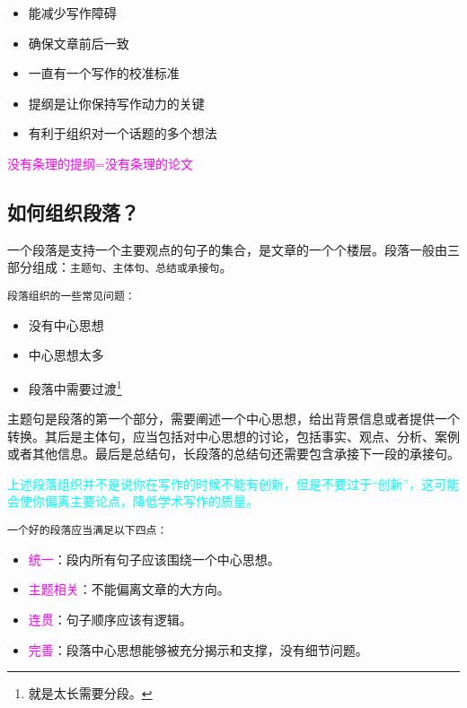 \documentclass[cn,hazy,blue,14pt,screen]{elegantnote} %
\begin{document}
\begin{itemize}
  \item 能减少写作障碍
  \item 确保文章前后一致
  \item 一直有一个写作的校准标准
  \item 提纲是让你保持写作动力的关键
  \item 有利于组织对一个话题的多个想法
\end{itemize}

\textcolor{magenta}{没有条理的提纲=没有条理的论文}

\subsection{如何组织段落？}

一个段落是支持一个主要观点的句子的集合，是文章的一个个楼层。段落一般由三部分组成：\lstinline{主题句、主体句、总结或承接句}。

\lstinline{段落组织的一些常见问题：}

\begin{itemize}
  \item 没有中心思想
  \item 中心思想太多
  \item 段落中需要过渡\footnote{就是太长需要分段。}
\end{itemize}

主题句是段落的第一个部分，需要阐述一个中心思想，给出背景信息或者提供一个转换。其后是主体句，应当包括对中心思想的讨论，包括事实、观点、分析、案例或者其他信息。最后是总结句，长段落的总结句还需要包含承接下一段的承接句。

\textcolor{cyan}{上述段落组织并不是说你在写作的时候不能有创新，但是不要过于“创新”，这可能会使你偏离主要论点，降低学术写作的质量。}

\lstinline{一个好的段落应当满足以下四点：}

\begin{itemize}
  \item \textcolor{magenta}{统一}：段内所有句子应该围绕一个中心思想。
  \item \textcolor{magenta}{主题相关}：不能偏离文章的大方向。
  \item \textcolor{magenta}{连贯}：句子顺序应该有逻辑。
  \item \textcolor{magenta}{完善}：段落中心思想能够被充分揭示和支撑，没有细节问题。
\end{itemize}

\newpage
\end{document}
